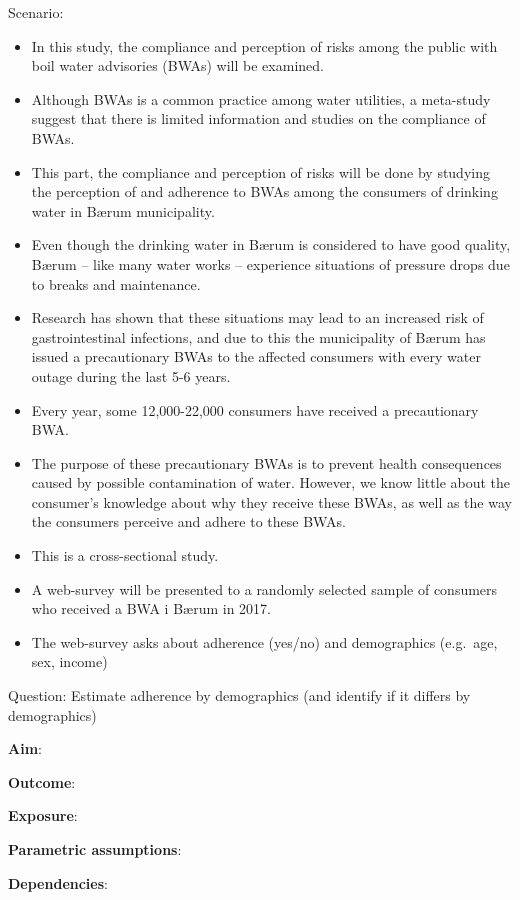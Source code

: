 \documentclass[12pt,]{article}
\providecommand{\tightlist}{%
  \setlength{\itemsep}{0pt}\setlength{\parskip}{0pt}}
\begin{document}
Scenario:

\begin{itemize}
\tightlist
\item
  In this study, the compliance and perception of risks among the public
  with boil water advisories (BWAs) will be examined.
\item
  Although BWAs is a common practice among water utilities, a meta-study
  suggest that there is limited information and studies on the
  compliance of BWAs.
\item
  This part, the compliance and perception of risks will be done by
  studying the perception of and adherence to BWAs among the consumers
  of drinking water in Bærum municipality.
\item
  Even though the drinking water in Bærum is considered to have good
  quality, Bærum -- like many water works -- experience situations of
  pressure drops due to breaks and maintenance.
\item
  Research has shown that these situations may lead to an increased risk
  of gastrointestinal infections, and due to this the municipality of
  Bærum has issued a precautionary BWAs to the affected consumers with
  every water outage during the last 5-6 years.
\item
  Every year, some 12,000-22,000 consumers have received a precautionary
  BWA.
\item
  The purpose of these precautionary BWAs is to prevent health
  consequences caused by possible contamination of water. However, we
  know little about the consumer's knowledge about why they receive
  these BWAs, as well as the way the consumers perceive and adhere to
  these BWAs.
\item
  This is a cross-sectional study.
\item
  A web-survey will be presented to a randomly selected sample of
  consumers who received a BWA i Bærum in 2017.
\item
  The web-survey asks about adherence (yes/no) and demographics
  (e.g.~age, sex, income)
\end{itemize}

Question: Estimate adherence by demographics (and identify if it differs
by demographics)

\textbf{Aim}:

\textbf{Outcome}:

\textbf{Exposure}:

\textbf{Parametric assumptions}:

\textbf{Dependencies}:
\end{document}

